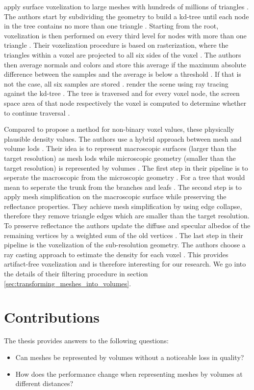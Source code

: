 \citeauthor{afra_voxel_lods} apply surface voxelization to large meshes with hundreds of millions of triangles \cite{afra_voxel_lods}.
The authors start by subdividing the geometry to build a kd-tree until each node in the tree contains no more than one triangle \cite{afra_voxel_lods}.
Starting from the root, voxelization is then performed on every third level for nodes with more than one triangle \cite{afra_voxel_lods}.
Their voxelization procedure is based on rasterization, where the triangles within a voxel are projected to all six sides of the voxel \cite{afra_voxel_lods}.
The authors then average normals and colors and store this average if the maximum absolute difference between the samples and the average is below a threshold \cite{afra_voxel_lods}.
If that is not the case, all six samples are stored \cite{afra_voxel_lods}.
\citeauthor{afra_voxel_lods} render the scene using ray tracing against the kd-tree \cite{afra_voxel_lods}.
The tree is traversed and for every voxel node, the screen space area of that node respectively the voxel is computed to determine whether to continue traversal \cite{afra_voxel_lods}.

Compared to \citeauthor{afra_voxel_lods} \citeauthor{hybrid_mesh_volume_lods} propose a method for non-binary voxel values, these physically plausible density values.
The authors use a hybrid approach between mesh and volume \acp{lod} \cite{hybrid_mesh_volume_lods}.
Their idea is to represent macroscopic surfaces (larger than the target resolution) as mesh \acsp{lod} while microscopic geometry (smaller than the target resolution) is represented by volumes \cite{hybrid_mesh_volume_lods}.
The first step in their pipeline is to seperate the macroscopic from the microscopic geometry \cite{hybrid_mesh_volume_lods}.
For a tree that would mean to seperate the trunk from the branches and leafs \cite{hybrid_mesh_volume_lods}.
The second step is to apply mesh simplification on the macroscopic surface while preserving the reflectance properties.
They achieve mesh simplification by using edge collapse, therefore they remove triangle edges which are smaller than the target resolution.
To preserve reflectance the authors update the diffuse and specular albedos of the remaining vertices by a weighted sum of the old vertices \cite{hybrid_mesh_volume_lods}.
The last step in their pipeline is the voxelization of the sub-resolution geometry.
The authors choose a ray casting approach to estimate the density for each voxel \cite{hybrid_mesh_volume_lods}.
This provides artifact-free voxelization and is therefore interesting for our research.
We go into the details of their filtering procedure in section \ref{sec:transforming_meshes_into_volumes}.





\section{Contributions}
The thesis provides answers to the following questions:
\begin{itemize}
	\item Can meshes be represented by volumes without a noticeable loss in quality?
	\item How does the performance change when representing meshes by volumes at different distances?
\end{itemize}
